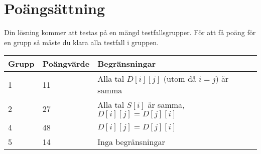 \section*{Poängsättning}
Din lösning kommer att testas på en mängd testfallsgrupper. För att få poäng för en grupp
så måste du klara alla testfall i gruppen.
\begin{tabular}{| l | l | l | l |}
\hline
Grupp & Poängvärde & Begränsningar \\ \hline
1     & 11         & Alla tal $D[i][j]$ (utom då $i = j$) är samma \\ \hline
2     & 27         & Alla tal $S[i]$ är samma, $D[i][j] = D[j][i]$\\ \hline
4     & 48         & $D[i][j] = D[j][i]$ \\ \hline
5     & 14         & Inga begränsningar \\ \hline
\end{tabular}
